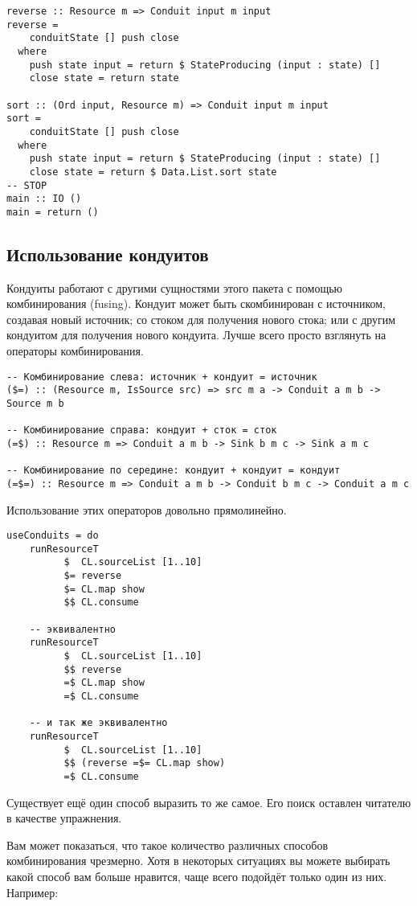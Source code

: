 {\begin{lstlisting}
reverse :: Resource m => Conduit input m input
reverse =
    conduitState [] push close
  where
    push state input = return $ StateProducing (input : state) []
    close state = return state

sort :: (Ord input, Resource m) => Conduit input m input
sort =
    conduitState [] push close
  where
    push state input = return $ StateProducing (input : state) []
    close state = return $ Data.List.sort state
-- STOP
main :: IO ()
main = return ()
\end{lstlisting}

\subsection{Использование кондуитов}
Кондуиты работают с другими сущностями этого пакета с помощью комбинирования (fusing).
Кондуит может быть скомбинирован с источником, создавая новый источник; 
со стоком для получения нового стока; или с другим кондуитом для получения 
нового кондуита. Лучше всего просто взглянуть на операторы комбинирования. 
\begin{lstlisting}
-- Комбинирование слева: источник + кондуит = источник
($=) :: (Resource m, IsSource src) => src m a -> Conduit a m b -> Source m b

-- Комбинирование справа: кондуит + сток = сток
(=$) :: Resource m => Conduit a m b -> Sink b m c -> Sink a m c

-- Комбинирование по середине: кондуит + кондуит = кондуит
(=$=) :: Resource m => Conduit a m b -> Conduit b m c -> Conduit a m c
\end{lstlisting}
Использование этих операторов довольно прямолинейно.
\begin{lstlisting}
useConduits = do
    runResourceT
          $  CL.sourceList [1..10]
          $= reverse
          $= CL.map show
          $$ CL.consume

    -- эквивалентно
    runResourceT
          $  CL.sourceList [1..10]
          $$ reverse
          =$ CL.map show
          =$ CL.consume

    -- и так же эквивалентно
    runResourceT
          $  CL.sourceList [1..10]
          $$ (reverse =$= CL.map show)
          =$ CL.consume
\end{lstlisting}
Существует ещё один способ выразить то же самое. Его поиск оставлен читателю
 в качестве упражнения.

Вам может показаться, что такое количество различных способов комбинирования 
чрезмерно. Хотя в некоторых ситуациях вы можете выбирать какой способ вам больше нравится,
чаще всего подойдёт только один из них. Например:

}
